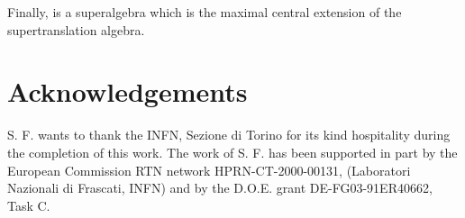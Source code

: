 \documentclass[a4paper,12pt]{article}
\begin{document}
Finally, \coordHE{} is a superalgebra which is
the maximal central extension of the supertranslation algebra.

































\section*{Acknowledgements}

S. F. wants to thank the INFN, Sezione di Torino for its kind
hospitality during the completion of this work.  The work of S. F.
has been supported in part by the European Commission RTN network
HPRN-CT-2000-00131, (Laboratori Nazionali di Frascati, INFN) and
by the D.O.E. grant DE-FG03-91ER40662, Task C.
\end{document}

